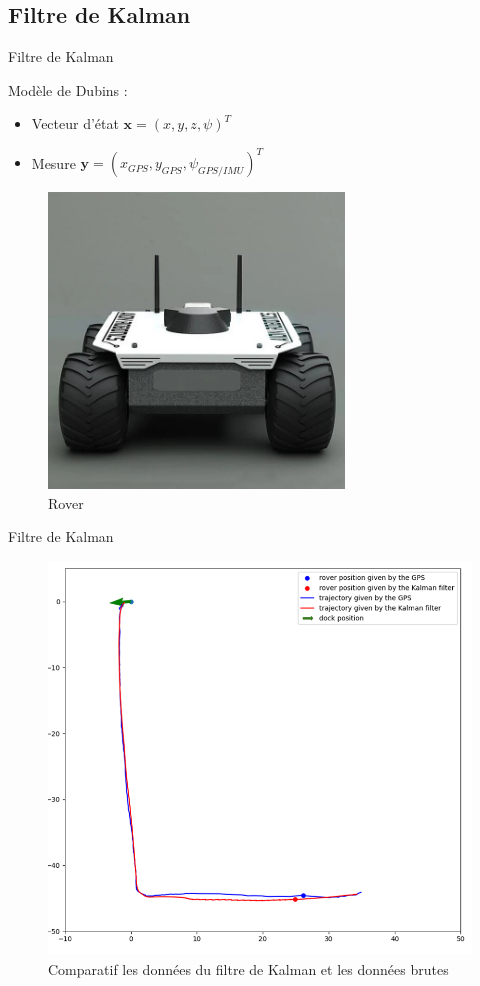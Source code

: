 \documentclass[pdftex,beamer,aspectratio=169]{beamer}
\theoremstyle{definition}
\theoremstyle{example}
\theoremstyle{plain}
\begin{document}
\subsection{Filtre de Kalman}
\begin{frame}[fragile]{Filtre de Kalman}
  \begin{minipage}{0.5\textwidth}
    Modèle de Dubins : 
    \begin{itemize}
      \item Vecteur d'état $\textbf{x}=(x, y, z, \psi)^T$
      \item Mesure $\textbf{y}=(x_{GPS}, y_{GPS}, \psi_{GPS/IMU})^T$
    \end{itemize}
  \end{minipage}
  \begin{minipage}{0.49\textwidth}
    \begin{figure}[H]
      \centering
      \includegraphics[width=0.7\textwidth]{rover.jpg}
      \caption{Rover}
    \end{figure}
  \end{minipage}
\end{frame}

\begin{frame}[fragile]{Filtre de Kalman}
    \begin{figure}
      \centering
      \includegraphics[width=.42\textwidth]{GPSvsKalman.png}
      \caption{Comparatif les données du filtre de Kalman et les données brutes}
      \label{fig:KalmanvsGPS}
    \end{figure}
\end{frame}
\end{document}
